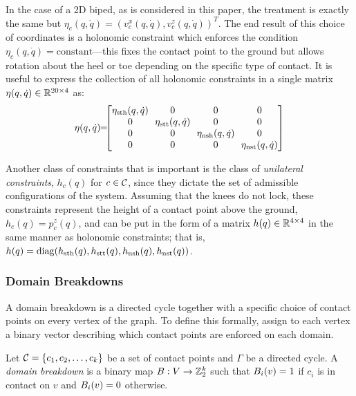 In the case of a 2D biped, as is considered in this paper, the treatment is exactly the same but $\eta_{c}(q, {\dot q}) = (v_{c}^{x}(q, {\dot q}), v_{c}^{z}(q, {\dot q}))^T$. The end result of this choice of coordinates is a holonomic constraint which enforces the condition $\eta_{c}(q, {\dot q}) = \mathrm{constant}$---this fixes the contact point to the ground but allows rotation about the heel or toe depending on the specific type of contact.  It is useful to express the collection of all holonomic constraints in a single matrix $\eta(q, {\dot q}) \in \mathbb{R}^{20 \times 4}$ as:
\begin{align}
  \eta(q, {\dot q}) \!\! = \!\!\! \left[\!\!\begin{array}{c c c c}
      \! \eta_{\sth}(q, {\dot q}) \! & 0 & 0 & 0 \\
      0 & \! \eta_{\stt}(q, {\dot q}) \! & 0 & 0 \\
      0 & 0 & \! \eta_{\nsh}(q, {\dot q}) \! & 0 \\
      0 & 0 & 0 & \! \eta_{\nst}(q, {\dot q}) \!
    \end{array}\!\!\right]
\end{align}

Another class of constraints that is important is the class of {\it unilateral constraints}, $h_{c}(q)$ for $c \in \mathcal{C}$, since they dictate the set of admissible configurations of the system.  Assuming that the knees do not lock, these constraints represent the height of a contact point above the ground, $h_{c}(q) = p_{c}^{z}(q)$, and can be put in the form of a matrix $h(q) \in \mathbb{R}^{4 \times 4}$ in the same manner as holonomic constraints; that is, $h(q) = \mathrm{diag}(h_{\mathrm{sth}}(q), h_{\mathrm{stt}}(q), h_{\mathrm{nsh}}(q), h_{\mathrm{nst}}(q))$.

\subsubsection{Domain Breakdowns}  A domain breakdown is a directed cycle together with a specific choice of contact points on every vertex of the graph. To define this formally, assign to each vertex a binary vector describing which contact points are enforced on each domain.

\gap

\begin{definition}
  \label{def:domainbreakdown}
  Let $\mathcal{C} = \{c_{1}, c_{2}, \ldots, c_{k}\}$ be a set of contact points and $\Gamma$ be a directed cycle.  A {\it domain breakdown} is a binary map $B : V \to \mathbb{Z}_{2}^{k}$ such that $B_{i}(v) = 1$ if $c_{i}$ is in contact on $v$ and $B_{i}(v) = 0$ otherwise.
\end{definition}

